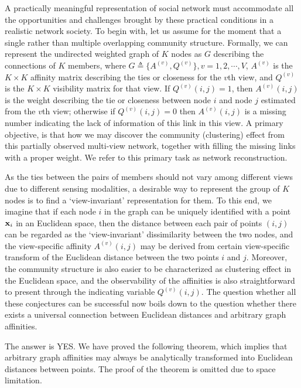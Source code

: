 A practically meaningful representation of social network must accommodate all the opportunities and challenges brought by these practical conditions in a realistic network society. To begin with, let us assume for the moment that a single rather than multiple overlapping community structure. Formally, we can represent the undirected weighted graph of $K$ nodes as $G$ describing the connections of $K$ members, where $G\triangleq\{A^{(v)}, Q^{(v)}\}, v=1,2,\cdots,V$, $A^{(v)}$ is the $K\times K$ affinity matrix describing the ties or closeness for the $v$th view, and $Q^{(v)}$ is the $K\times K$ visibility matrix for that view. If $Q^{(v)}(i,j)=1$, then $A^{(v)}(i,j)$ is the weight describing the tie or closeness between node $i$ and node $j$ estimated from the $v$th view; otherwise if $Q^{(v)}(i,j)=0$ then $A^{(v)}(i,j)$ is a missing number indicating the lack of information of this link in this view. A primary objective, is that how we may discover the community (clustering) effect from this partially observed multi-view network, together with filling the missing links with a proper weight. We refer to this primary task as network reconstruction.

As the ties between the pairs of members should not vary among different views due to different sensing modalities, a desirable way to represent the group of $K$ nodes is to find a `view-invariant' representation for them. To this end, we imagine that if each node $i$ in the graph can be uniquely identified with a point ${\bf x}_i$ in an Euclidean space, then the distance between each pair of points $(i,j)$ can be regarded as the `view-invariant' dissimilarity between the two nodes, and the view-specific affinity $A^{(v)}(i,j)$ may be derived from certain view-specific transform of the Euclidean distance between the two points $i$ and $j$. Moreover, the community structure is also easier to be characterized as clustering effect in the Euclidean space, and the observability of the affinities is also straightforward to present through the indicating variable $Q^{(v)}(i,j)$. The question whether all these conjectures can be successful now boils down to the question whether there exists a universal connection between Euclidean distances and arbitrary graph affinities.

The answer is YES. We have proved the following theorem, which implies that arbitrary graph affinities may always be analytically transformed into Euclidean distances between points. The proof of the theorem is omitted due to space limitation.


